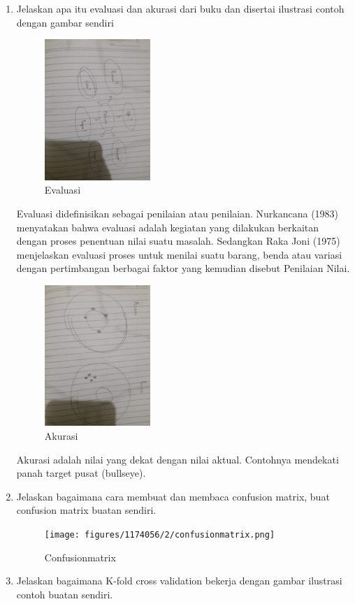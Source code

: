\begin{enumerate}
	\item Jelaskan apa itu evaluasi dan akurasi dari buku dan disertai ilustrasi contoh dengan gambar sendiri
	\hfill\break
	\begin{figure}[H]
		\includegraphics[width=4cm]{figures/1174056/2/Evaluasi.jpg}
		\centering
		\caption{Evaluasi}
	\end{figure}
	\hfill\break
	Evaluasi didefinisikan sebagai penilaian atau penilaian. Nurkancana (1983) menyatakan bahwa evaluasi adalah kegiatan yang dilakukan berkaitan dengan proses 
	penentuan nilai suatu masalah. Sedangkan Raka Joni (1975) menjelaskan evaluasi proses untuk menilai suatu barang, benda atau variasi dengan pertimbangan berbagai 
	faktor yang kemudian disebut Penilaian Nilai.
	\begin{figure}[H]
		\includegraphics[width=4cm]{figures/1174056/2/akurasi.jpg}
		\centering
		\caption{Akurasi}
	\end{figure}
	\hfill\break
	Akurasi adalah nilai yang dekat dengan nilai aktual. Contohnya mendekati panah target pusat (bullseye).
	\item Jelaskan bagaimana cara membuat dan membaca confusion matrix, buat confusion matrix buatan sendiri.
	\hfill\break
	\begin{figure}[H]
		\texttt{[image: figures/1174056/2/confusionmatrix.png]}
		\centering
		\caption{Confusionmatrix}
	\end{figure}
	\hfill\break
	\item Jelaskan bagaimana K-fold cross validation bekerja dengan gambar ilustrasi contoh buatan sendiri.

\end{enumerate}

